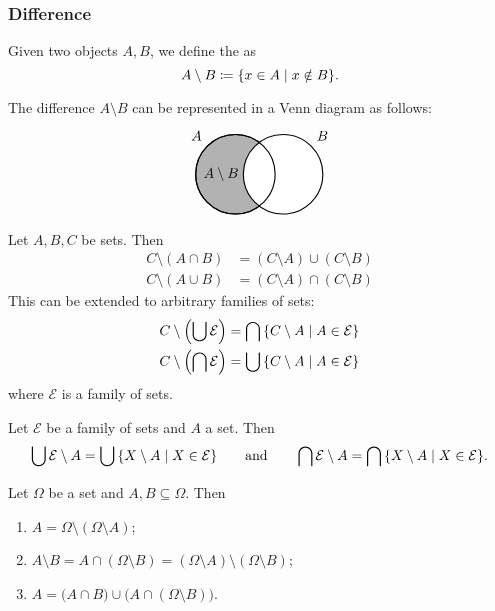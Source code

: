 \subsubsection{Difference}
\begin{definition}
Given two objects $A,B$, we define the  as
\[A\setminus B \defeq \setbuilder{x\in A}{x\notin B}. \]
\end{definition}
The difference $A\setminus B$ can be represented in a Venn diagram as follows:
\[ \begin{tikzpicture}[thick,
    set/.style = {circle,
        minimum size = 2cm}]

\node[set,draw,fill=black!30,label={135:$A$}] (A) at (0,0) {};

\node[set,draw,fill=white,label={45:$B$}] (B) at (1.2,0) {};

\draw (0,0) circle(1cm);

\node at (-0.36,0) {$A\setminus B$};
\end{tikzpicture} \]

\begin{proposition}
Let $A,B,C$ be sets. Then
\begin{align*}
C\setminus (A\cap B) &= (C\setminus A)\cup(C\setminus B) \\
C\setminus (A\cup B) &= (C\setminus A)\cap(C\setminus B)
\end{align*}
This can be extended to arbitrary families of sets:
\begin{align*}
C\setminus\left(\bigcup \mathcal{E}\right) &= \bigcap\setbuilder{C\setminus A}{A\in\mathcal{E}} \\
C\setminus\left(\bigcap \mathcal{E}\right) &= \bigcup\setbuilder{C\setminus A}{A\in\mathcal{E}}
\end{align*}
where $\mathcal{E}$ is a family of sets.
\end{proposition}
\begin{lemma}
Let $\mathcal{E}$ be a family of sets and $A$ a set. Then
\[ \bigcup \mathcal{E} \setminus A = \bigcup\setbuilder{X\setminus A}{X\in\mathcal{E}} \qquad\text{and}\qquad \bigcap \mathcal{E} \setminus A = \bigcap\setbuilder{X\setminus A}{X\in\mathcal{E}}. \]
\end{lemma}

\begin{lemma} \label{setDifferenceComplement}
Let $\Omega$ be a set and $A,B\subseteq \Omega$. Then
\begin{enumerate}
\item $A = \Omega \setminus (\Omega \setminus A)$;
\item $A\setminus B = A \cap (\Omega\setminus B) = (\Omega \setminus A)\setminus (\Omega \setminus B)$;
\item $A = \big(A\cap B\big) \cup \big(A\cap (\Omega\setminus B)\big)$.
\end{enumerate}
\end{lemma}

